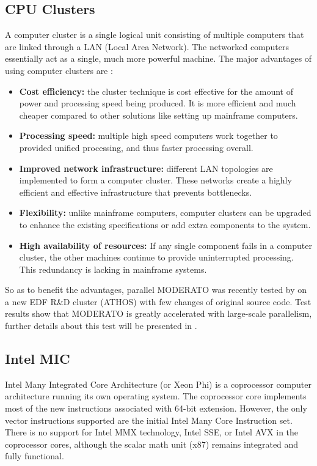 
\subsection{CPU Clusters}
A computer cluster is a single logical unit consisting of multiple computers that are linked through a LAN (Local Area Network). The networked computers essentially act as a single, much more powerful machine. The major advantages of using computer clusters are \citep{cluster}:
\begin{itemize}
\it
{} %
\item \textbf{Cost efficiency: }the cluster technique is cost effective for the amount of power and processing speed being produced. It is more efficient and much cheaper compared to other solutions like setting up mainframe computers.
\item \textbf{Processing speed: }multiple high speed computers work together to provided unified processing, and thus faster processing overall.
\item \textbf{Improved network infrastructure: }different LAN topologies are implemented to form a computer cluster. These networks create a highly efficient and effective infrastructure that prevents bottlenecks.
\item \textbf{Flexibility: }unlike mainframe computers, computer clusters can be upgraded to enhance the existing specifications or add extra components to the system.
\item \textbf{High availability of resources: }If any single component fails in a computer cluster, the other machines continue to provide uninterrupted processing. This redundancy is lacking in mainframe systems.
\end{itemize}
So as to benefit the advantages, parallel MODERATO was recently tested by {\supname} on a new EDF R\&D cluster (ATHOS) with few changes of original source code. Test results show that MODERATO is greatly accelerated with large-scale parallelism, further details about this test will be presented in .
\subsection{Intel MIC}
Intel Many Integrated Core Architecture (or Xeon Phi) is a coprocessor computer architecture running its own operating system. The coprocessor core implements most of the new instructions associated with 64-bit extension. However, the only vector instructions supported are the initial Intel Many Core Instruction set. There is no support for Intel MMX technology, Intel SSE, or Intel AVX in the coprocessor cores, although the scalar math unit (x87) remains integrated and fully functional.

